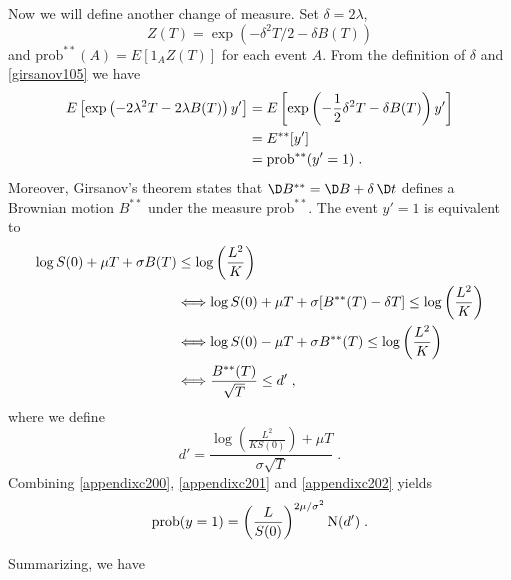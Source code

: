 Now we will define another change of measure.  Set $\delta = 2\lambda$, 
$$Z(T) = \exp\left(-\delta^2 T/2 - \delta B(T)\right)$$ 
and $\text{prob}^{**}(A) = E[1_A Z(T)]$ for each event $A$.    From the definition of $\delta$ and  \eqref{girsanov105} we have
\begin{align}
E\left[\exp\left(-2\lambda^2T - 2\lambda B(T)\right)y'\right] &= E\left[\exp\left(-\frac{1}{2}\delta^2T - \delta B(T)\right)y'\right] \notag\\
& = E^{**}[y'] \notag\\
&= \text{prob}^{**}(y'=1)\;.\label{appendixc201}
\end{align}
Moreover, Girsanov's theorem states that $\D B^{**} = \D B + \delta\,\D t$ defines a Brownian motion $B^{**}$ under the measure $\text{prob}^{**}$.  The event $y'=1$ is equivalent to
\begin{align}
\log S(0) + \mu T + \sigma B(T) &\leq  \log \left(\frac{L^2}{K}\right) \notag\\&\Longleftrightarrow \log S(0) + \mu T + \sigma [B^{**}(T) - \delta T] \leq \log \left(\frac{L^2}{K}\right)\notag \\
&\Longleftrightarrow \log S(0) - \mu T + \sigma B^{**}(T) \leq \log \left(\frac{L^2}{K}\right) \notag\\
&\Longleftrightarrow \frac{B^{**}(T)}{\sqrt{T}} \leq d'\;,\label{appendixc202}
\end{align}
where we define
\begin{equation}\label{appendixc103}
d' = \frac{\log \left(\frac{L^2}{KS(0)}\right) + \mu T }{\sigma\sqrt{T}}\;.
\end{equation}
Combining \eqref{appendixc200}, \eqref{appendixc201} and \eqref{appendixc202} yields
$$\text{prob}(y=1) = \left(\frac{L}{S(0)}\right)^{2\mu/\sigma^2}\operatorname{N}(d')\; .$$

Summarizing, we have

